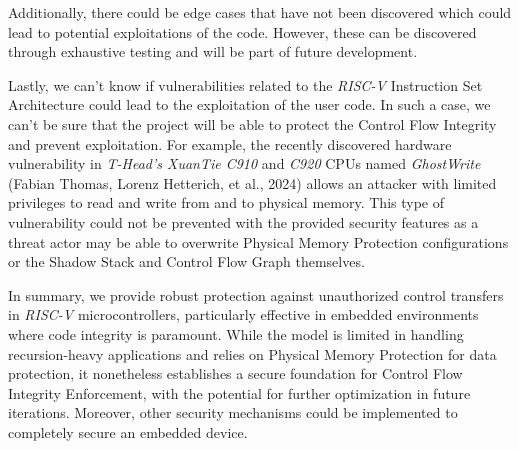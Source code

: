 Additionally, there could be edge cases that have not been discovered which could
lead to potential exploitations of the code. However, these can be discovered through
exhaustive testing and will be part of future development.

Lastly, we can't know if vulnerabilities related to the \textit{RISC-V} Instruction
Set Architecture could lead to the exploitation of the user code. In such a case,
we can't be sure that the project will be able to protect the Control Flow Integrity
and prevent exploitation. For example, the recently discovered hardware vulnerability
in \textit{T-Head's XuanTie C910} and \textit{C920} CPUs named \textit{GhostWrite}\cite{riscvuzz}
(Fabian Thomas, Lorenz Hetterich, et al., 2024) allows an attacker with limited privileges
to read and write from and to physical memory. This type of vulnerability could
not be prevented with the provided security features as a threat actor may be
able to overwrite Physical Memory Protection configurations or the Shadow Stack
and Control Flow Graph themselves.

In summary, we provide robust protection against unauthorized control transfers in
\textit{RISC-V} microcontrollers, particularly effective in embedded environments
where code integrity is paramount. While the model is limited in handling
recursion-heavy applications and relies on Physical Memory Protection for data
protection, it nonetheless establishes a secure foundation for Control Flow Integrity
Enforcement, with the potential for further optimization in future iterations. Moreover,
other security mechanisms could be implemented to completely secure an embedded
device.
